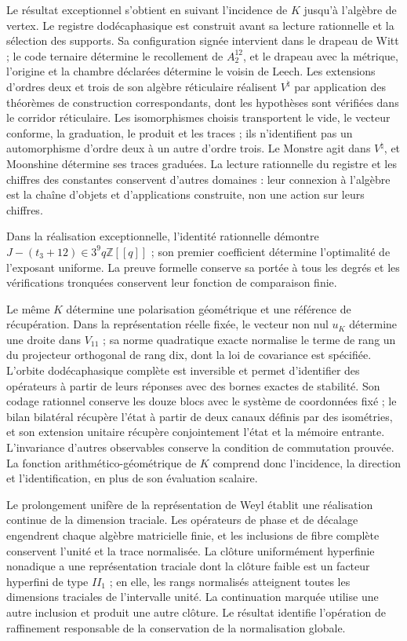 Le résultat exceptionnel s’obtient en suivant l’incidence de \(K\)
jusqu’à l’algèbre de vertex. Le registre dodécaphasique est construit avant
sa lecture rationnelle et la sélection des supports. Sa configuration
signée intervient dans le drapeau de Witt ; le code ternaire détermine
le recollement de \(A_2^{12}\), et le drapeau avec la métrique, l’origine et la
chambre déclarées détermine le voisin de Leech. Les extensions
d’ordres deux et trois de son algèbre réticulaire réalisent \(V^\natural\)
par application des théorèmes de construction correspondants, dont
les hypothèses sont vérifiées dans le corridor réticulaire. Les isomorphismes
choisis transportent le vide, le vecteur conforme, la graduation, le produit et les
traces ; ils n’identifient pas un automorphisme d’ordre deux à un autre d’ordre
trois. Le Monstre agit dans \(V^\natural\), et Moonshine détermine ses
traces graduées. La lecture rationnelle du registre et les chiffres des
constantes conservent d’autres domaines : leur connexion à l’algèbre est la
chaîne d’objets et d’applications construite, non une action sur leurs chiffres.

Dans la réalisation
exceptionnelle, l’identité rationnelle démontre
\(J-(t_3+12)\in3^9q\mathbb Z[[q]]\) ; son premier coefficient détermine
l’optimalité de l’exposant uniforme. La preuve formelle conserve sa
portée à tous les degrés et les vérifications tronquées conservent
leur fonction de comparaison finie.

Le même \(K\) détermine une polarisation géométrique et une référence
de récupération. Dans la représentation réelle fixée, le vecteur non nul
\(u_K\) détermine une droite dans \(V_{11}\) ; sa norme quadratique
exacte normalise le terme de rang un du projecteur orthogonal de rang
dix, dont la loi de covariance est spécifiée.
L’orbite dodécaphasique complète est inversible et permet d’identifier
des opérateurs à partir de leurs réponses avec des bornes exactes de stabilité.
Son codage rationnel conserve les douze blocs avec le système de coordonnées fixé ;
le bilan bilatéral récupère l’état à partir de deux canaux définis par des isométries,
et son extension unitaire récupère conjointement l’état et la mémoire
entrante. L’invariance d’autres observables conserve la condition
de commutation prouvée. La fonction arithmético-géométrique de \(K\)
comprend donc l’incidence, la direction et l’identification, en plus
de son évaluation scalaire.

Le prolongement unifère de la représentation de Weyl établit une
réalisation continue de la dimension traciale. Les opérateurs de phase
et de décalage engendrent chaque algèbre matricielle finie, et les
inclusions de fibre complète conservent l’unité et la trace normalisée.
La clôture uniformément hyperfinie nonadique a une représentation
traciale dont la clôture faible est un facteur hyperfini de type \(II_1\) ;
en elle, les rangs normalisés atteignent toutes les dimensions traciales
de l’intervalle unité. La continuation marquée utilise une autre inclusion
et produit une autre clôture. Le résultat identifie l’opération de
raffinement responsable de la conservation de la normalisation globale.

